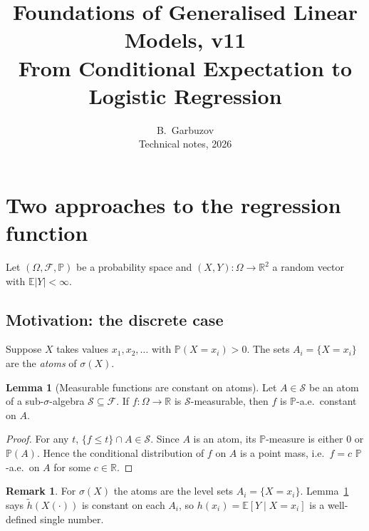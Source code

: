 \documentclass[12pt, a4paper]{article}
\title{\textbf{Foundations of Generalised Linear Models, v11}\\
\large From Conditional Expectation to Logistic Regression}
\author{B.~Garbuzov\\[4pt]
{\small Technical notes, 2026}}
\date{}
\theoremstyle{definition}
\newtheorem{lemma}{Lemma}[section]
\newtheorem{remark}{Remark}[section]
\newcommand{\E}{\mathbb{E}}
\newcommand{\R}{\mathbb{R}}
\newcommand{\Prob}{\mathbb{P}}
\newcommand{\sF}{\mathcal{F}}
\begin{document}
\maketitle
\tableofcontents
\newpage

\section{Two approaches to the regression function}

Let $(\Omega, \sF, \Prob)$ be a probability space and
$(X, Y) : \Omega \to \R^2$ a random vector with $\E|Y| < \infty$.

\subsection{Motivation: the discrete case}

Suppose $X$ takes values $x_1, x_2, \ldots$ with $\Prob(X=x_i)>0$.
The sets $A_i = \{X=x_i\}$ are the \emph{atoms} of $\sigma(X)$.

\begin{lemma}[Measurable functions are constant on atoms]
\label{lem:atoms}
Let $A \in \mathcal{S}$ be an atom of a sub-$\sigma$-algebra
$\mathcal{S} \subseteq \sF$.
If $f:\Omega\to\R$ is $\mathcal{S}$-measurable, then $f$ is
$\Prob$-a.e.\ constant on $A$.
\end{lemma}

\begin{proof}
For any $t$, $\{f\leq t\}\cap A\in\mathcal{S}$.
Since $A$ is an atom, its $\Prob$-measure is either $0$ or $\Prob(A)$.
Hence the conditional distribution of $f$ on $A$ is a point mass,
i.e.\ $f=c$ $\Prob$-a.e.\ on $A$ for some $c\in\R$.
\end{proof}

\begin{remark}
For $\sigma(X)$ the atoms are the level sets $A_i=\{X=x_i\}$.
Lemma~\ref{lem:atoms} says $\tilde h(X(\cdot))$ is constant on each
$A_i$, so $h(x_i)=\E[Y\mid X=x_i]$ is a well-defined single number.
\end{remark}
\end{document}
